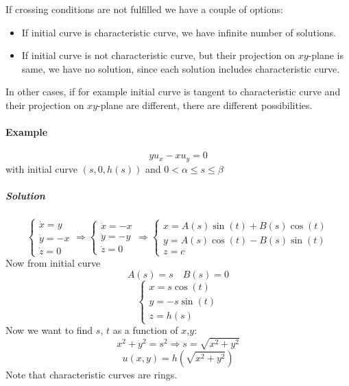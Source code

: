 If crossing conditions are not fulfilled we have a couple of options:
\begin{itemize}
	\item If initial curve is characteristic curve, we have infinite number of solutions.
	\item If initial curve is not characteristic curve, but their projection on $xy$-plane is same, we have no solution, since each solution includes characteristic curve.
\end{itemize}

In other cases, if for example initial curve is tangent to characteristic curve and their projection on $xy$-plane are different, there are different possibilities.

\paragraph{Example}
$$yu_x - xu_y = 0$$
with initial curve $(s,0,h(s))$ and $0<\alpha\leq s\leq \beta$
\subparagraph{Solution}
$$\begin{cases}
\dot{x} = y\\
\dot{y} = -x\\
\dot{z} = 0
\end{cases} \Rightarrow \begin{cases}
\ddot{x} = -x\\
\ddot{y} = -y\\
\dot{z} = 0
\end{cases} \Rightarrow \begin{cases}
x = A(s)\sin(t)+B(s)\cos(t)\\
y = A(s)\cos(t)-B(s)\sin(t)\\
z = c
\end{cases}$$
Now from initial curve
$$A(s)= s \quad B(s) = 0$$
$$ \begin{cases}
x = s\cos(t)\\
y = -s\sin(t)\\
z = h(s)
\end{cases}$$
Now we want to find $s$, $t$ as a function of $x$,$y$:
$$x^2+y^2 = s^2 \Rightarrow s = \sqrt{x^2+y^2}$$
$$u(x,y)  = h\left(\sqrt{x^2+y^2}\right)$$
Note that characteristic curves are rings.

